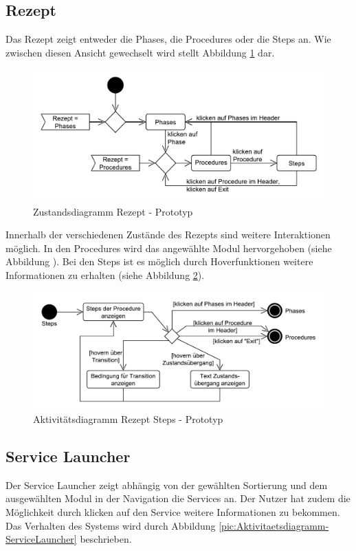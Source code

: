 \subsection{Rezept}
Das Rezept zeigt entweder die Phases, die Procedures oder die Steps an. Wie zwischen diesen Ansicht gewechselt wird stellt Abbildung \ref{pic:Zustandsdiagramm-Rezept} dar.
\begin{figure}[htbp]
\centering
\includegraphics[scale=0.6]{DA_files/UML/Prototyp/Zustandsdiagramm-Rezept.pdf}
\caption{Zustandsdiagramm Rezept - Prototyp}
\label{pic:Zustandsdiagramm-Rezept}
\end{figure}

Innerhalb der verschiedenen Zustände des Rezepts sind weitere Interaktionen möglich. In den Procedures wird das angewählte Modul hervorgehoben (siehe Abbildung ). Bei den Steps ist es möglich durch Hoverfunktionen weitere Informationen zu erhalten (siehe Abbildung \ref{pic:Aktivitaetsdiagramm-Rezept-Steps}).

\begin{figure}[htbp]
\centering
\includegraphics[scale=0.6]{DA_files/UML/Prototyp/Aktivitaetsdiagramm-Rezept-Steps.pdf}
\caption{Aktivitätsdiagramm Rezept Steps - Prototyp}
\label{pic:Aktivitaetsdiagramm-Rezept-Steps}
\end{figure}

\subsection{Service Launcher}
Der Service Launcher zeigt abhängig von der gewählten Sortierung und dem ausgewählten Modul in der Navigation die Services an. Der Nutzer hat zudem die Möglichkeit durch klicken auf den Service weitere Informationen zu bekommen. Das Verhalten des Systems wird durch Abbildung \ref{pic:Aktivitaetsdiagramm-ServiceLauncher} beschrieben.

